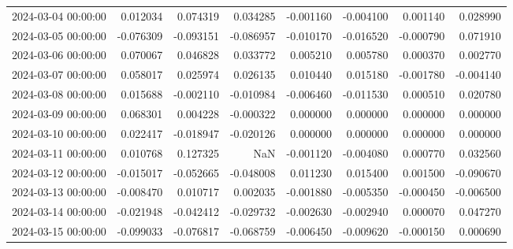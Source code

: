 \begin{tabular}{lrrrrrrr}
2024-03-04 00:00:00 & 0.012034 & 0.074319 & 0.034285 & -0.001160 & -0.004100 & 0.001140 & 0.028990 \\
2024-03-05 00:00:00 & -0.076309 & -0.093151 & -0.086957 & -0.010170 & -0.016520 & -0.000790 & 0.071910 \\
2024-03-06 00:00:00 & 0.070067 & 0.046828 & 0.033772 & 0.005210 & 0.005780 & 0.000370 & 0.002770 \\
2024-03-07 00:00:00 & 0.058017 & 0.025974 & 0.026135 & 0.010440 & 0.015180 & -0.001780 & -0.004140 \\
2024-03-08 00:00:00 & 0.015688 & -0.002110 & -0.010984 & -0.006460 & -0.011530 & 0.000510 & 0.020780 \\
2024-03-09 00:00:00 & 0.068301 & 0.004228 & -0.000322 & 0.000000 & 0.000000 & 0.000000 & 0.000000 \\
2024-03-10 00:00:00 & 0.022417 & -0.018947 & -0.020126 & 0.000000 & 0.000000 & 0.000000 & 0.000000 \\
2024-03-11 00:00:00 & 0.010768 & 0.127325 & NaN & -0.001120 & -0.004080 & 0.000770 & 0.032560 \\
2024-03-12 00:00:00 & -0.015017 & -0.052665 & -0.048008 & 0.011230 & 0.015400 & 0.001500 & -0.090670 \\
2024-03-13 00:00:00 & -0.008470 & 0.010717 & 0.002035 & -0.001880 & -0.005350 & -0.000450 & -0.006500 \\
2024-03-14 00:00:00 & -0.021948 & -0.042412 & -0.029732 & -0.002630 & -0.002940 & 0.000070 & 0.047270 \\
2024-03-15 00:00:00 & -0.099033 & -0.076817 & -0.068759 & -0.006450 & -0.009620 & -0.000150 & 0.000690 \\
\bottomrule
\end{tabular}

